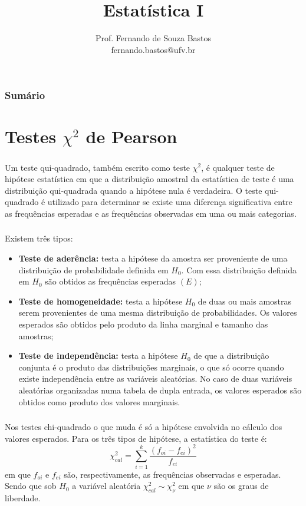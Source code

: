 \documentclass[14pt,aspectratio=1610]{beamer}
\title{Estatística I}
\author{Prof. Fernando de Souza Bastos \texorpdfstring{\\ fernando.bastos@ufv.br}{}}
\institute{Departamento de Estatística \texorpdfstring{\\ Universidade Federal de Viçosa}{}\texorpdfstring{\\ Campus UFV - Viçosa}{}}
\date{}
\newcommand{\Ho}{\ensuremath{H_{0}}}
\begin{document}
%

\frame{\titlepage}

\begin{frame}{}
\frametitle{\bf Sumário}
\tableofcontents
\end{frame}

\section{Testes $\chi^{2}$ de Pearson}
\begin{frame}{}
\frametitle{}
\begin{block}{}
\justifying
Um teste qui-quadrado, também escrito como teste $\chi^{2}$, é qualquer teste de hipótese estatística em que a distribuição amostral da estatística de teste é uma distribuição qui-quadrada quando a hipótese nula é verdadeira. O teste qui-quadrado é utilizado para determinar se existe uma diferença significativa entre as frequências esperadas e as frequências observadas em uma ou mais categorias.
\end{block}
\end{frame}

\begin{frame}{}
\frametitle{}
\begin{block}{}
\justifying
Existem três tipos:
\begin{itemize}
\item {\bf Teste de aderência:} \justifying testa a hipótese da amostra ser proveniente de uma distribuição de probabilidade definida em $\Ho.$ Com essa distribuição definida em $\Ho$ são obtidos as frequências esperadas $(E);$\pause
\item {\bf Teste de homogeneidade:} testa a hipótese $\Ho$ de duas ou mais amostras serem provenientes de uma mesma distribuição de probabilidades. Os valores esperados são obtidos pelo produto da linha marginal e tamanho das amostras;\pause
\item {\bf Teste de independência:} testa a hipótese $\Ho$ de que a distribuição conjunta é o produto das distribuições marginais, o que só ocorre quando existe independência entre as variáveis aleatórias. No caso de duas variáveis aleatórias organizadas numa tabela de dupla entrada, os valores esperados são obtidos como produto dos valores marginais.
\end{itemize}
\end{block}
\end{frame}

\begin{frame}{}
\frametitle{}
\begin{block}{}
\justifying
Nos testes chi-quadrado o que muda é só a hipótese envolvida no cálculo dos valores esperados. Para os três tipos de hipótese, a estatística do teste é:
$$\chi^{2}_{cal}={\displaystyle \sum_{i=1}^{k}\dfrac{(f_{oi}-f_{ei})^{2}}{f_{ei}}}$$
em que $f_{oi}$ e $f_{ei}$ são, respectivamente, as frequências observadas e esperadas. Sendo que sob $\Ho$ a variável aleatória $\chi^{2}_{cal}\sim \chi^{2}_{\nu}$ em que $\nu$ são os graus de liberdade.
\nocite{Apostila}
\end{block}
\end{frame}
\end{document}
